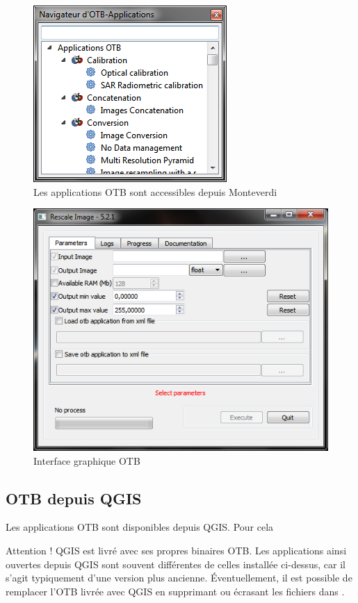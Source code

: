 \documentclass[10pt,a4paper]{article}
\begin{document}
\begin{figure}[h]
  \center
  \includegraphics[scale=1]{Art/windows-mapla.png}
  \caption[]{Les applications OTB sont accessibles depuis Monteverdi}
  \label{fig:windows-mapla}
\end{figure}

\begin{figure}[h]
  \center
  \includegraphics[scale=1]{Art/windows-otbgui.png}
  \caption[]{Interface graphique OTB}
  \label{fig:windows-otbgui}
\end{figure}

\subsection{OTB depuis QGIS}

Les applications OTB sont disponibles depuis QGIS. Pour cela

Attention ! QGIS est livré avec ses propres binaires OTB. Les applications ainsi
ouvertes depuis QGIS sont souvent différentes de celles installée ci-dessus, car
il s'agit typiquement d'une version plus ancienne.
Éventuellement, il est possible de remplacer l'OTB livrée avec QGIS en supprimant
ou écrasant les fichiers dans \texttt{}.
\end{document}
